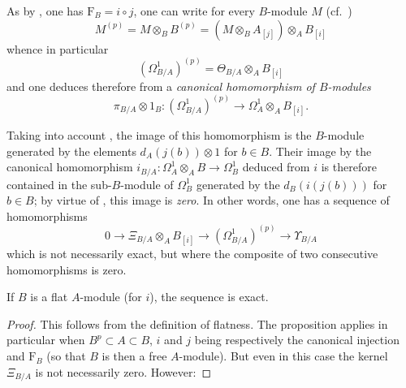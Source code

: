 \begin{env}[21.3.3]
\label{0.21.3.3}
As by , one has $\mathrm{F}_B=i\circ j$, one can write for every $B$-module $M$ (cf.\ )
\begin{equation}
\tag{21.3.3.1}
  \label{0.21.3.3.1}
  M^{(p)}=M\otimes_B B^{(p)}=(M\otimes_B A_{[j]})\otimes_A B_{[i]}
\end{equation}
whence in particular
\begin{equation}
\tag{21.3.3.2}
  \label{0.21.3.3.2}
  (\Omega^1_{B/A})^{(p)}=\Theta_{B/A}\otimes_A B_{[i]}
\end{equation}
and one deduces therefore from  a \emph{canonical homomorphism of $B$-modules}
\begin{equation}
\tag{21.3.3.3}
  \label{0.21.3.3.3}
  \pi_{B/A}\otimes 1_B:(\Omega^1_{B/A})^{(p)}\to\Omega^1_A\otimes_A B_{[i]}.
\end{equation}

Taking into account , the image of this homomorphism is the $B$-module generated by the elements $d_A(j(b))\otimes 1$ for $b\in B$.
Their image by the canonical homomorphism $i_{B/A}:\Omega^1_A\otimes_A B\to\Omega^1_B$ deduced from $i$  is therefore contained in the sub-$B$-module of $\Omega^1_B$ generated by the $d_B(i(j(b)))$ for $b\in B$; by virtue of , this image is \emph{zero}.
In other words, one has a sequence of homomorphisms
\begin{equation}
\tag{21.3.3.4}
  \label{0.21.3.3.4}
  0\to\Xi_{B/A}\otimes_A B_{[i]}\to(\Omega^1_{B/A})^{(p)}\to\Upsilon_{B/A}
\end{equation}
which is not necessarily exact, but where the composite of two consecutive homomorphisms is zero.
\end{env}

\begin{proposition}[21.3.4]
\label{0.21.3.4}
If $B$ is a flat $A$-module \textup{(}for $i$\textup{)}, the sequence  is exact.
\end{proposition}

\begin{proof}
This follows from the definition of flatness.
The proposition  applies in particular when $B^p\subset A\subset B$, $i$ and $j$ being respectively the canonical injection and $\mathrm{F}_B$ (so that $B$ is then a free $A$-module).
But even in this case the kernel $\Xi_{B/A}$ is not necessarily zero.
However:
\end{proof}

